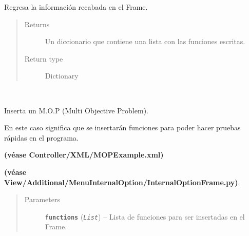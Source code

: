 \documentclass[letterpaper,10pt,english]{sphinxmanual}
\begin{document}
\begin{fulllineitems}
\begin{fulllineitems}
\begin{quote}
\begin{description}
\end{description}\end{quote}

\end{fulllineitems}


\begin{fulllineitems}
\label{View/Main/ObjectiveFunction/ObjectiveFunctionFrame:View.Main.ObjectiveFunction.ObjectiveFunctionFrame.ObjectiveFunctionFrame.get_information}
Regresa la información recabada en el Frame.
\begin{quote}\begin{description}
\item[{Returns}] \leavevmode
Un diccionario que contiene una lista con las funciones escritas.

\item[{Return type}] \leavevmode
Dictionary

\end{description}\end{quote}

\end{fulllineitems}


\begin{fulllineitems}
\label{View/Main/ObjectiveFunction/ObjectiveFunctionFrame:View.Main.ObjectiveFunction.ObjectiveFunctionFrame.ObjectiveFunctionFrame.insert_mop_example}~
\begin{DUlineblock}{0em}
\item[] Inserta un M.O.P (Multi Objective Problem).
\item[] En este caso significa que se insertarán funciones
para poder hacer pruebas rápidas en el programa.
\item[] \textbf{(véase Controller/XML/MOPExample.xml)}
\item[] \textbf{(véase View/Additional/MenuInternalOption/InternalOptionFrame.py)}.
\end{DUlineblock}
\begin{quote}\begin{description}
\item[{Parameters}] \leavevmode
\textbf{\texttt{functions}} (\emph{\texttt{List}}) -- Lista de funciones para ser insertadas en el Frame.


\end{description}
\end{quote}
\end{fulllineitems}
\end{fulllineitems}
\end{document}
